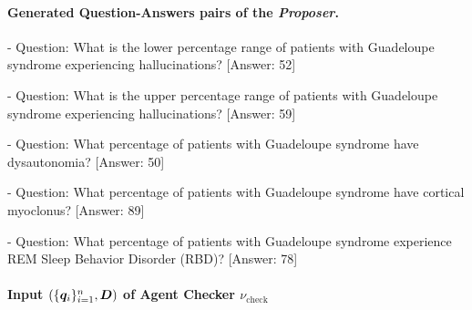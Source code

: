 \documentclass[10pt, a4paper, logo]{googledeepmind} %
\begin{document}
\paragraph{Generated Question-Answers pairs of the \textit{Proposer}.}

\begin{tcolorbox}[
    enhanced,
    breakable,
    colback=promptgreen,           %
    colframe=bordergray,           %
    boxrule=1pt,                   %
    sharp corners,                 %
]
\begin{flushleft}
    - Question: What is the lower percentage range of patients with Guadeloupe syndrome experiencing hallucinations?
    [Answer: 52]
    \vspace{1em}
    
    - Question: What is the upper percentage range of patients with Guadeloupe syndrome experiencing hallucinations?
    [Answer: 59]
    \vspace{1em}
    
    - Question: What percentage of patients with Guadeloupe syndrome have dysautonomia?
    [Answer: 50]
    \vspace{1em}
    
    - Question: What percentage of patients with Guadeloupe syndrome have cortical myoclonus?
    [Answer: 89]
    \vspace{1em}
    
    - Question: What percentage of patients with Guadeloupe syndrome experience REM Sleep Behavior Disorder (RBD)?
    \vspace{1em}
    [Answer: 78]
\end{flushleft}
\end{tcolorbox}

    
\paragraph{Input $(\{{\bm{q}}_i\}_{i=1}^n,{\bm{D}})$ of Agent Checker $\nu_\text{check}$}
\end{document}
